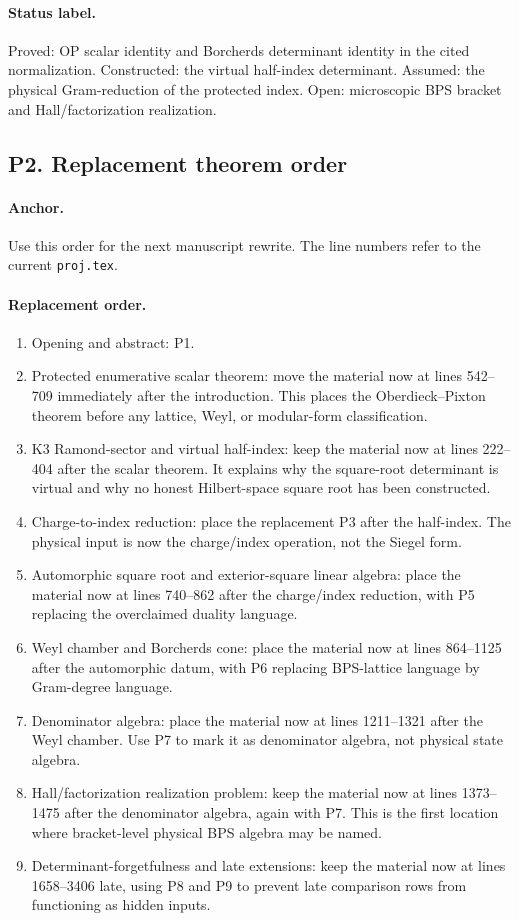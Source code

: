 \paragraph{Status label.}
Proved: OP scalar identity and Borcherds determinant identity in the cited
normalization.  Constructed: the virtual half-index determinant.  Assumed:
the physical Gram-reduction of the protected index.  Open: microscopic
BPS bracket and Hall/factorization realization.

\subsection{P2. Replacement theorem order}

\paragraph{Anchor.}
Use this order for the next manuscript rewrite.  The line numbers refer to
the current \texttt{proj.tex}.

\paragraph{Replacement order.}
\begin{enumerate}
\item Opening and abstract: P1.
\item Protected enumerative scalar theorem: move the material now at
lines 542--709 immediately after the introduction.  This places the
Oberdieck--Pixton theorem before any lattice, Weyl, or modular-form
classification.
\item K3 Ramond-sector and virtual half-index: keep the material now at
lines 222--404 after the scalar theorem.  It explains why the square-root
determinant is virtual and why no honest Hilbert-space square root has
been constructed.
\item Charge-to-index reduction: place the replacement P3 after the
half-index.  The physical input is now the charge/index operation, not the
Siegel form.
\item Automorphic square root and exterior-square linear algebra: place
the material now at lines 740--862 after the charge/index reduction, with
P5 replacing the overclaimed duality language.
\item Weyl chamber and Borcherds cone: place the material now at
lines 864--1125 after the automorphic datum, with P6 replacing BPS-lattice
language by Gram-degree language.
\item Denominator algebra: place the material now at lines 1211--1321
after the Weyl chamber.  Use P7 to mark it as denominator algebra, not
physical state algebra.
\item Hall/factorization realization problem: keep the material now at
lines 1373--1475 after the denominator algebra, again with P7.  This is
the first location where bracket-level physical BPS algebra may be named.
\item Determinant-forgetfulness and late extensions: keep the material now
at lines 1658--3406 late, using P8 and P9 to prevent late comparison rows
from functioning as hidden inputs.
\end{enumerate}

